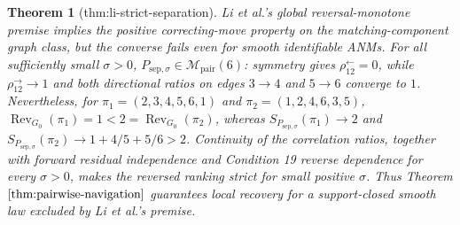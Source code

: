 \documentclass{article}
\newtheorem{theorem}{Theorem}
\begin{document}
\begin{theorem}[thm:li-strict-separation]\label{thm:li-strict-separation}
Li et al.'s global reversal-monotone premise implies the positive correcting-move property on the matching-component graph class, but the converse fails even for smooth identifiable ANMs. For all sufficiently small \(\sigma>0\), \(P_{\mathrm{sep},\sigma}\in\mathcal M_{\mathrm{pair}}(6)\): symmetry gives \(\rho^{\leftarrow}_{12}=0\), while \(\rho^{\to}_{12}\to1\) and both directional ratios on edges \(3\to4\) and \(5\to6\) converge to \(1\). Nevertheless, for \(\pi_1=(2,3,4,5,6,1)\) and \(\pi_2=(1,2,4,6,3,5)\), \(\operatorname{Rev}_{G_0}(\pi_1)=1<2=\operatorname{Rev}_{G_0}(\pi_2)\), whereas \(S_{P_{\mathrm{sep},\sigma}}(\pi_1)\to2\) and \(S_{P_{\mathrm{sep},\sigma}}(\pi_2)\to1+4/5+5/6>2\). Continuity of the correlation ratios, together with forward residual independence and Condition 19 reverse dependence for every \(\sigma>0\), makes the reversed ranking strict for small positive \(\sigma\). Thus Theorem \(\ref{thm:pairwise-navigation}\) guarantees local recovery for a support-closed smooth law excluded by Li et al.'s premise.
\end{theorem}
\end{document}
